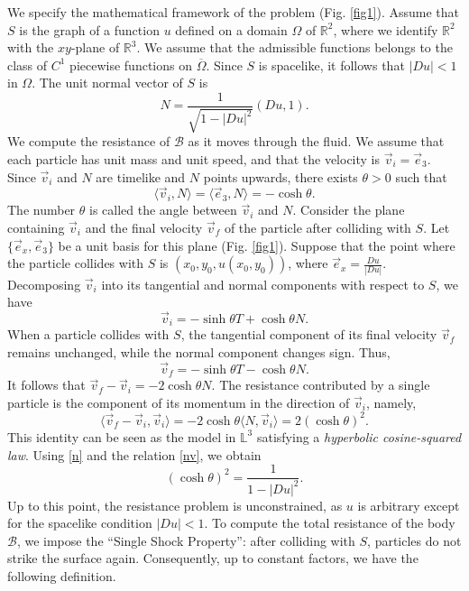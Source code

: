 \documentclass[a4paper,12pt]{amsart}
\theoremstyle{definition}
\def\r{\mathbb R}
\def\l{\mathbb L}
\begin{document}
We   specify the mathematical  framework of the problem (Fig. \ref{fig1}). Assume that $S$ is  the graph of a function $u$ defined on a domain $\Omega$ of $\r^2$, where we identify $\r^2$ with the $xy$-plane of $\r^3$. We assume that  the admissible functions belongs to the class of $C^1$  piecewise functions on $\overline{\Omega}$. Since $S$ is   spacelike, it follows that $|Du|<1$ in $\Omega$. The unit normal vector of $S$ is 
\begin{equation}\label{n}
N=\frac{1}{\sqrt{1-|Du|^2}}\left( Du,1\right).
\end{equation}
We   compute the resistance of $\mathcal{B}$ as it moves through  the fluid.  We assume that each  particle has unit mass and unit speed, and that the  velocity is $\vec{v}_i=\vec{e}_3$. Since $\vec{v}_i$ and $N$ are timelike and $N$ points upwards, there exists $\theta>0$ such that 
\begin{equation}\label{nv}
\langle\vec{v}_i,N\rangle=\langle \vec{e}_3,N\rangle=-\cosh\theta.
\end{equation}
The number $\theta$ is called the angle between $\vec{v}_i$ and $N$. Consider the plane containing $\vec{v}_i$ and the final velocity $\vec{v}_f$ of the particle after colliding with $S$. Let $\{\vec{e}_x,\vec{e}_3\}$ be a unit basis for this plane (Fig. \ref{fig1}). Suppose that the point where the particle collides with $S$ is $(x_0,y_0,u(x_0,y_0))$, where $\vec{e}_x=\frac{Du}{|Du|}$.  
Decomposing $\vec{v}_i$ into its tangential and normal components with respect to $S$, we have
 $$\vec{v}_i=-\sinh\theta T+\cosh\theta N.$$
  When a particle  collides  with $S$, the tangential component of its final velocity $\vec{v}_f$ remains unchanged, while  the normal component changes sign. Thus,
  $$\vec{v}_f=-\sinh\theta T-\cosh\theta N.$$
  It follows that $\vec{v}_f-\vec{v}_i=-2\cosh\theta N$.     The resistance contributed by a single  particle is the component of its momentum in the direction of $\vec{v}_i$, namely, 
 $$\langle \vec{v}_f-\vec{v}_i,\vec{v}_i\rangle=-2\cosh\theta \langle N,\vec{v}_i\rangle=2(\cosh\theta)^2.$$
 This identity can be seen as the model in $\l^3$ satisfying a {\it hyperbolic cosine-squared law}.  Using \eqref{n} and the relation \eqref{nv}, we obtain 
 $$(\cosh\theta)^2=\frac{1}{1-|Du|^2}.$$
 Up to this point,  the resistance problem is unconstrained, as  $u$ is arbitrary except for the spacelike condition $|Du|<1$. To  compute the total resistance of the body $\mathcal{B}$, we impose  the ``Single Shock Property'':   after colliding with  $S$, particles  do not strike the surface again.   Consequently,  up to constant factors, we have the following definition.
 
\end{document}
